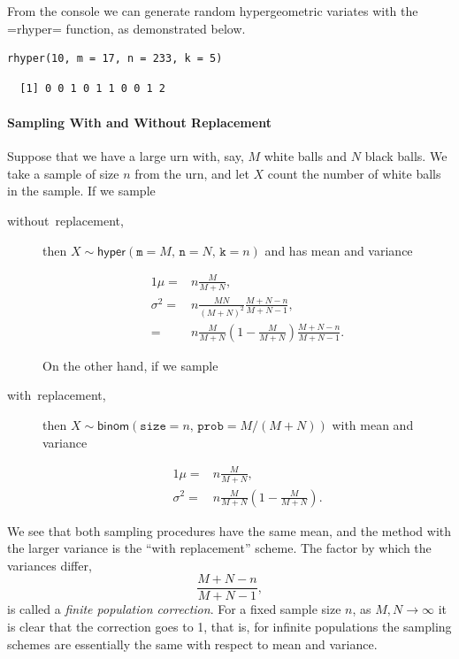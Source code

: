 \documentclass[captions=tableheading]{scrbook}
\begin{document}
\begin{enumerate}
From the console we can generate random hypergeometric variates with the =rhyper= function, as demonstrated below.


\begin{verbatim}
rhyper(10, m = 17, n = 233, k = 5)
\end{verbatim}

\begin{verbatim}
  [1] 0 0 1 0 1 1 0 0 1 2
\end{verbatim}

\end{enumerate}

\paragraph*{Sampling With and Without Replacement}
\label{sub:Sampling-With-and}

Suppose that we have a large urn with, say, \(M\) white balls and \(N\) black balls. We take a sample of size \(n\) from the urn, and let \(X\) count the number of white balls in the sample. If we sample

\begin{description}
\item[{without~replacement,}] then \(X\sim\mathsf{hyper}(\mathtt{m=}M,\,\mathtt{n}=N,\,\mathtt{k}=n)\) and has mean and variance

\begin{alignat*}{1}
\mu= & n\frac{M}{M+N},\\
\sigma^{2}= & n\frac{MN}{(M+N)^{2}}\frac{M+N-n}{M+N-1},\\
= & n\frac{M}{M+N}\left(1-\frac{M}{M+N}\right)\frac{M+N-n}{M+N-1}.
\end{alignat*}

On the other hand, if we sample
\item[{with~replacement,}] then \(X\sim\mathsf{binom}(\mathtt{size}=n,\,\mathtt{prob}=M/(M+N))\) with mean and variance

\begin{alignat*}{1}
\mu= & n\frac{M}{M+N},\\
\sigma^{2}= & n\frac{M}{M+N}\left(1-\frac{M}{M+N}\right).
\end{alignat*}

\end{description}

We see that both sampling procedures have the same mean, and the method with the larger variance is the ``with replacement'' scheme. The factor by which the variances differ,
\begin{equation}
\frac{M+N-n}{M+N-1},
\end{equation}
is called a \emph{finite population correction}. For a fixed sample size \(n\), as \(M,N\to\infty\) it is clear that the correction goes to 1, that is, for infinite populations the sampling schemes are essentially the same with respect to mean and variance.
\end{document}
